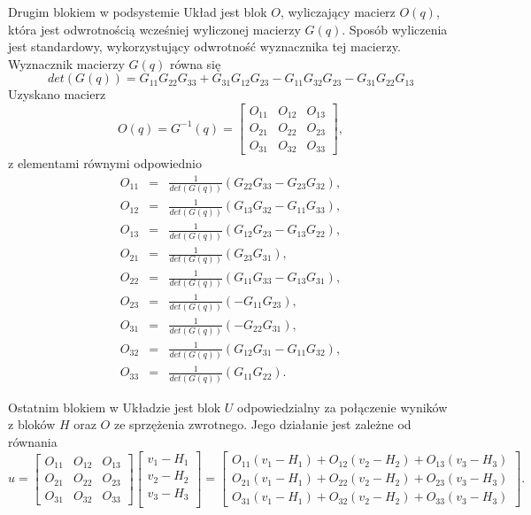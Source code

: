 \documentclass[eng,printmode]{mgr}
\begin{document}
Drugim blokiem w podsystemie Układ jest blok $O$, wyliczający macierz $O(q)$, która jest odwrotnością wcześniej wyliczonej macierzy $G(q)$. Sposób wyliczenia jest standardowy, wykorzystujący odwrotność wyznacznika tej macierzy. Wyznacznik macierzy $G(q)$ równa się
\begin{equation}
det(G(q))=G_{11}G_{22}G_{33}+G_{31}G_{12}G_{23}-G_{11}G_{32}G_{23}-G_{31}G_{22}G_{13}
\end{equation}
Uzyskano macierz
$$
O(q)=G^{-1}(q)=\left[
      \begin{array}{ccc}
         O_{11} & O_{12} & O_{13}\\ 
         O_{21} &O_{22} & O_{23}\\
         O_{31} & O_{32} & O_{33}
         \end{array}
      \right],
      $$
      z elementami równymi odpowiednio
      \begin{eqnarray}
      O_{11}&=&\frac{1}{det(G(q))}(G_{22}G_{33}-G_{23}G_{32}),\\ \nonumber
      O_{12}&=&\frac{1}{det(G(q))}(G_{13}G_{32}-G_{11}G_{33}),\\ \nonumber
      O_{13}&=&\frac{1}{det(G(q))}(G_{12}G_{23}-G_{13}G_{22}),\\ \nonumber
      O_{21}&=&\frac{1}{det(G(q))}(G_{23}G_{31}),\\ \nonumber
      O_{22}&=&\frac{1}{det(G(q))}(G_{11}G_{33}-G_{13}G_{31}),\\ \nonumber
      O_{23}&=&\frac{1}{det(G(q))}(-G_{11}G_{23}),\\ \nonumber
      O_{31}&=&\frac{1}{det(G(q))}(-G_{22}G_{31}),\\ \nonumber
      O_{32}&=&\frac{1}{det(G(q))}(G_{12}G_{31}-G_{11}G_{32}),\\ \nonumber
      O_{33}&=&\frac{1}{det(G(q))}(G_{11}G_{22}).
      \end{eqnarray}
 
Ostatnim blokiem w Układzie jest blok $U$ odpowiedzialny za połączenie wyników z bloków $H$ oraz $O$ ze sprzężenia zwrotnego. Jego działanie jest zależne od równania
$$
u=\left[
\begin{array}{ccc}
O_{11} & O_{12} & O_{13}\\ 
         O_{21} &O_{22} & O_{23}\\
         O_{31} & O_{32} & O_{33}
         \end{array}
      \right]\left[
      \begin{array}{c}
      v_1-H_1\\
      v_2-H_2\\
      v_3-H_3\\
      \end{array}
      \right]=\left[
      \begin{array}{c}
      O_{11}(v_1-H_1)+O_{12}(v_2-H_2)+O_{13}(v_3-H_3)\\
      O_{21}(v_1-H_1)+O_{22}(v_2-H_2)+O_{23}(v_3-H_3)\\
      O_{31}(v_1-H_1)+O_{32}(v_2-H_2)+O_{33}(v_3-H_3)
      \end{array}
            \right].
$$
\end{document}
